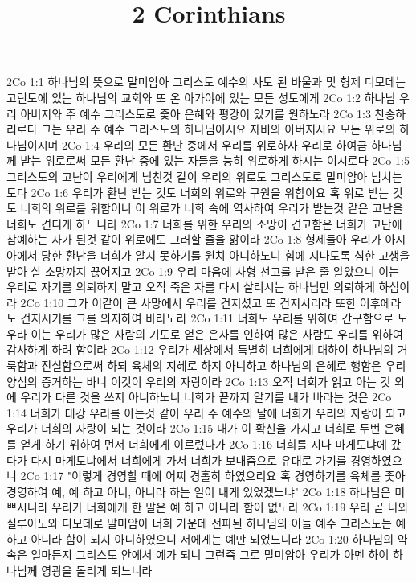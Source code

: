 

\title{2 Corinthians}

2Co 1:1  하나님의 뜻으로 말미암아 그리스도 예수의 사도 된 바울과 및 형제 디모데는 고린도에 있는 하나님의 교회와 또 온 아가야에 있는 모든 성도에게
2Co 1:2  하나님 우리 아버지와 주 예수 그리스도로 좇아 은혜와 평강이 있기를 원하노라
2Co 1:3  찬송하리로다 그는 우리 주 예수 그리스도의 하나님이시요 자비의 아버지시요 모든 위로의 하나님이시며
2Co 1:4  우리의 모든 환난 중에서 우리를 위로하사 우리로 하여금 하나님께 받는 위로로써 모든 환난 중에 있는 자들을 능히 위로하게 하시는 이시로다
2Co 1:5  그리스도의 고난이 우리에게 넘친것 같이 우리의 위로도 그리스도로 말미암아 넘치는도다
2Co 1:6  우리가 환난 받는 것도 너희의 위로와 구원을 위함이요 혹 위로 받는 것도 너희의 위로를 위함이니 이 위로가 너희 속에 역사하여 우리가 받는것 같은 고난을 너희도 견디게 하느니라
2Co 1:7  너희를 위한 우리의 소망이 견고함은 너희가 고난에 참예하는 자가 된것 같이 위로에도 그러할 줄을 앎이라
2Co 1:8  형제들아 우리가 아시아에서 당한 환난을 너희가 알지 못하기를 원치 아니하노니 힘에 지나도록 심한 고생을 받아 살 소망까지 끊어지고
2Co 1:9  우리 마음에 사형 선고를 받은 줄 알았으니 이는 우리로 자기를 의뢰하지 말고 오직 죽은 자를 다시 살리시는 하나님만 의뢰하게 하심이라
2Co 1:10  그가 이같이 큰 사망에서 우리를 건지셨고 또 건지시리라 또한 이후에라도 건지시기를 그를 의지하여 바라노라
2Co 1:11  너희도 우리를 위하여 간구함으로 도우라 이는 우리가 많은 사람의 기도로 얻은 은사를 인하여 많은 사람도 우리를 위하여 감사하게 하려 함이라
2Co 1:12  우리가 세상에서 특별히 너희에게 대하여 하나님의 거룩함과 진실함으로써 하되 육체의 지혜로 하지 아니하고 하나님의 은혜로 행함은 우리 양심의 증거하는 바니 이것이 우리의 자랑이라
2Co 1:13  오직 너희가 읽고 아는 것 외에 우리가 다른 것을 쓰지 아니하노니 너희가 끝까지 알기를 내가 바라는 것은
2Co 1:14  너희가 대강 우리를 아는것 같이 우리 주 예수의 날에 너희가 우리의 자랑이 되고 우리가 너희의 자랑이 되는 것이라
2Co 1:15  내가 이 확신을 가지고 너희로 두번 은혜를 얻게 하기 위하여 먼저 너희에게 이르렀다가
2Co 1:16  너희를 지나 마게도냐에 갔다가 다시 마게도냐에서 너희에게 가서 너희가 보내줌으로 유대로 가기를 경영하였으니
2Co 1:17  "이렇게 경영할 때에 어찌 경홀히 하였으리요 혹 경영하기를 육체를 좇아 경영하여 예, 예 하고 아니, 아니라 하는 일이 내게 있었겠느냐"
2Co 1:18  하나님은 미쁘시니라 우리가 너희에게 한 말은 예 하고 아니라 함이 없노라
2Co 1:19  우리 곧 나와 실루아노와 디모데로 말미암아 너희 가운데 전파된 하나님의 아들 예수 그리스도는 예 하고 아니라 함이 되지 아니하였으니 저에게는 예만 되었느니라
2Co 1:20  하나님의 약속은 얼마든지 그리스도 안에서 예가 되니 그런즉 그로 말미암아 우리가 아멘 하여 하나님께 영광을 돌리게 되느니라

